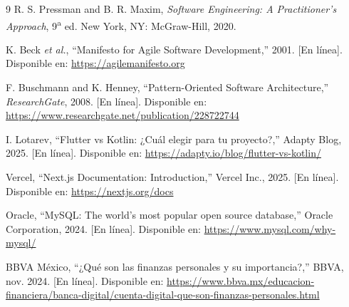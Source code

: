 \documentclass[10pt,twocolumn,letterpaper]{article}
\begin{document}
\begin{thebibliography}{9}
R. S. Pressman and B. R. Maxim, \textit{Software Engineering: A Practitioner's Approach},
9\textsuperscript{a} ed. New York, NY: McGraw-Hill, 2020.

K. Beck \textit{et al.}, ``Manifesto for Agile Software Development,'' 2001.
[En línea]. Disponible en: \url{https://agilemanifesto.org}

F. Buschmann and K. Henney, ``Pattern-Oriented Software Architecture,''
\textit{ResearchGate}, 2008. [En línea].
Disponible en: \url{https://www.researchgate.net/publication/228722744}

I. Lotarev, ``Flutter vs Kotlin: ¿Cuál elegir para tu proyecto?,''
Adapty Blog, 2025. [En línea].
Disponible en: \url{https://adapty.io/blog/flutter-vs-kotlin/}

Vercel, ``Next.js Documentation: Introduction,''
Vercel Inc., 2025. [En línea].
Disponible en: \url{https://nextjs.org/docs}

Oracle, ``MySQL: The world's most popular open source database,''
Oracle Corporation, 2024. [En línea].
Disponible en: \url{https://www.mysql.com/why-mysql/}

BBVA México, ``¿Qué son las finanzas personales y su importancia?,''
BBVA, nov. 2024. [En línea].
Disponible en: \url{https://www.bbva.mx/educacion-financiera/banca-digital/cuenta-digital-que-son-finanzas-personales.html}

\end{thebibliography}
\endgroup
\end{document}
